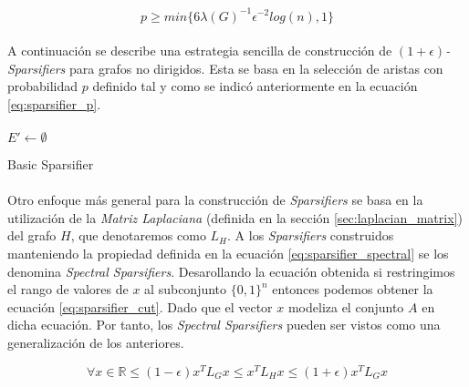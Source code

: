 \documentclass{subfiles}
\begin{document}
        \begin{equation}
        \label{eq:sparsifier_p}
          p \geq min\{6\lambda(G)^{-1}\epsilon^{-2}log(n),1\}
        \end{equation}

        \paragraph{}
        A continuación se describe una estrategia sencilla de construcción de \emph{$(1 +\epsilon)$-Sparsifiers} para grafos no dirigidos. Esta se basa en la selección de aristas con probabilidad $p$ definido tal y como se indicó anteriormente en la ecuación \eqref{eq:sparsifier_p}.

        \paragraph{}
        \begin{algorithm}
          \SetAlgoLined
          $E' \gets \emptyset$\;
          \caption{Basic Sparsifier}
          \label{code:basic_sparsifier}
        \end{algorithm}

        \paragraph{}
        Otro enfoque más general para la construcción de \emph{Sparsifiers} se basa en la utilización de la \emph{Matriz Laplaciana} (definida en la sección \ref{sec:laplacian_matrix}) del grafo $H$, que denotaremos como $L_{H}$. A los \emph{Sparsifiers} construidos manteniendo la propiedad definida en la ecuación \eqref{eq:sparsifier_spectral} se los denomina \emph{Spectral Sparsifiers}. Desarollando la ecuación obtenida si restringimos el rango de valores de $x$ al subconjunto $\{ 0, 1\}^n$ entonces podemos obtener la ecuación \ref{eq:sparsifier_cut}. Dado que el vector $x$ modeliza el conjunto $A$ en dicha ecuación. Por tanto, los \emph{Spectral Sparsifiers} pueden ser vistos como una generalización de los anteriores.

        \begin{equation}
        \label{eq:sparsifier_spectral}
          \forall x \in \mathbb{R} \leq (1 - \epsilon) x^TL_{G}x \leq x^TL_{H}x \leq (1 + \epsilon) x^TL_{G}x
        \end{equation}
\end{document}
